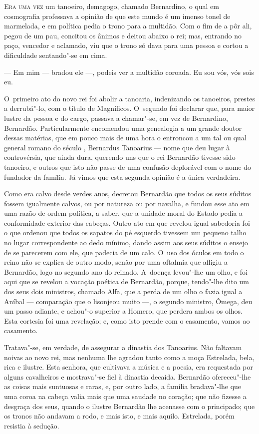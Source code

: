 \begin{linenumbers}

\textsc{Era uma vez} um tanoeiro, demagogo, chamado Bernardino, o qual em
cosmografia professava a opinião de que este mundo é um imenso tonel de
marmelada, e em política pedia o trono para a multidão. Com o fim de a
pôr ali, pegou de um pau, concitou os ânimos e deitou abaixo o rei; mas,
entrando no paço, vencedor e aclamado, viu que o trono só dava para uma
pessoa e cortou a dificuldade sentando"-se em cima.

--- Em mim --- bradou ele ---, podeis ver a multidão coroada. Eu sou vós,
vós sois eu.

O~primeiro ato do novo rei foi abolir a tanoaria, indenizando os
tanoeiros, prestes a derrubá"-lo, com o título de Magníficos. O~segundo
foi declarar que, para maior lustre da pessoa e do cargo, passava a
chamar"-se, em vez de Bernardino, Bernardão. Particularmente encomendou
uma genealogia a um grande doutor dessas matérias, que em pouco mais de
uma hora o entroncou a um tal ou qual general romano do século ,
Bernardus Tanoarius --- nome que deu lugar à controvérsia, que ainda
dura, querendo uns que o rei Bernardão tivesse sido tanoeiro, e outros
que isto não passe de uma confusão deplorável com o nome do fundador da
família. Já vimos que esta segunda opinião é a única verdadeira.

Como era calvo desde verdes anos, decretou Bernardão que todos os seus
súditos fossem igualmente calvos, ou por natureza ou por navalha, e
fundou esse ato em uma razão de ordem política, a saber, que a unidade
moral do Estado pedia a conformidade exterior das cabeças. Outro ato em
que revelou igual sabedoria foi o que ordenou que todos os sapatos do pé
esquerdo tivessem um pequeno talho no lugar correspondente ao dedo
mínimo, dando assim aos seus súditos o ensejo de se parecerem com ele,
que padecia de um calo. O~uso dos óculos em todo o reino não se explica
de outro modo, senão por uma oftalmia que afligiu a Bernardão, logo no
segundo ano do reinado. A~doença levou"-lhe um olho, e foi aqui que se
revelou a vocação poética de Bernardão, porque, tendo"-lhe dito um dos
seus dois ministros, chamado Alfa, que a perda de um olho o fazia igual
a Aníbal --- comparação que o lisonjeou muito ---, o segundo ministro,
Ômega, deu um passo adiante, e achou"-o superior a Homero, que perdera
ambos os olhos. Esta cortesia foi uma revelação; e, como isto prende com
o casamento, vamos ao casamento.

Tratava"-se, em verdade, de assegurar a dinastia dos Tanoarius. Não
faltavam noivas ao novo rei, mas nenhuma lhe agradou tanto como a moça
Estrelada, bela, rica e ilustre. Esta senhora, que cultivava a música e
a poesia, era requestada por alguns cavalheiros e mostrava"-se fiel à
dinastia decaída. Bernardão ofereceu"-lhe as coisas mais suntuosas e
raras, e, por outro lado, a família bradava"-lhe que uma coroa na cabeça
valia mais que uma saudade no coração; que não fizesse a desgraça dos
seus, quando o ilustre Bernardão lhe acenasse com o principado; que os
tronos não andavam a rodo, e mais isto, e mais aquilo. Estrelada, porém
resistia à sedução.


\end{linenumbers}
